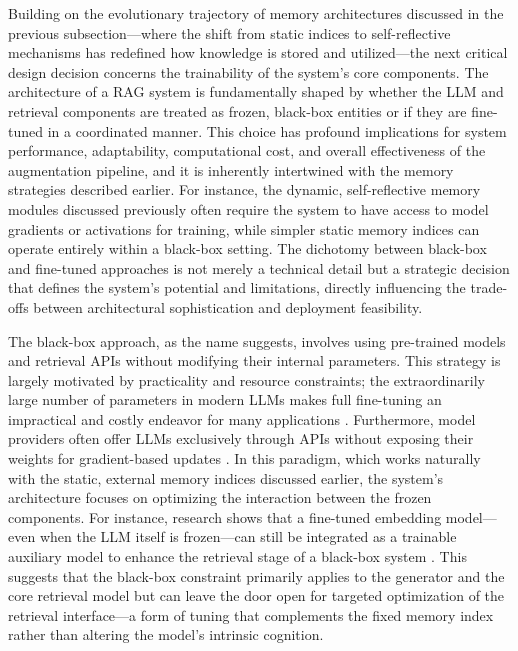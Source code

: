\documentclass[11pt]{article}
\begin{document}
Building on the evolutionary trajectory of memory architectures discussed in the previous subsection---where the shift from static indices to self-reflective mechanisms has redefined how knowledge is stored and utilized---the next critical design decision concerns the trainability of the system's core components. The architecture of a RAG system is fundamentally shaped by whether the LLM and retrieval components are treated as frozen, black-box entities or if they are fine-tuned in a coordinated manner. This choice has profound implications for system performance, adaptability, computational cost, and overall effectiveness of the augmentation pipeline, and it is inherently intertwined with the memory strategies described earlier. For instance, the dynamic, self-reflective memory modules discussed previously often require the system to have access to model gradients or activations for training, while simpler static memory indices can operate entirely within a black-box setting. The dichotomy between black-box and fine-tuned approaches is not merely a technical detail but a strategic decision that defines the system's potential and limitations, directly influencing the trade-offs between architectural sophistication and deployment feasibility.

The black-box approach, as the name suggests, involves using pre-trained models and retrieval APIs without modifying their internal parameters. This strategy is largely motivated by practicality and resource constraints; the extraordinarily large number of parameters in modern LLMs makes full fine-tuning an impractical and costly endeavor for many applications \cite{ref66}. Furthermore, model providers often offer LLMs exclusively through APIs without exposing their weights for gradient-based updates \cite{ref57}. In this paradigm, which works naturally with the static, external memory indices discussed earlier, the system's architecture focuses on optimizing the interaction between the frozen components. For instance, research shows that a fine-tuned embedding model---even when the LLM itself is frozen---can still be integrated as a trainable auxiliary model to enhance the retrieval stage of a black-box system \cite{ref67}. This suggests that the black-box constraint primarily applies to the generator and the core retrieval model but can leave the door open for targeted optimization of the retrieval interface---a form of tuning that complements the fixed memory index rather than altering the model's intrinsic cognition.
\end{document}
